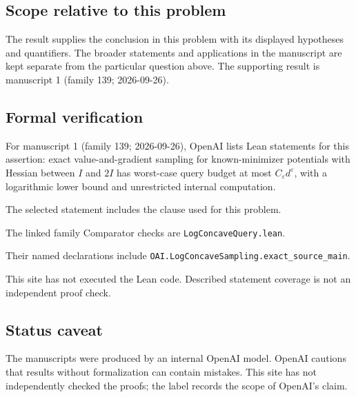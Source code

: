 \documentclass[11pt]{article}
\begin{document}
\subsection{Scope relative to this problem}
The result supplies the conclusion in this problem with its displayed hypotheses and quantifiers. The broader statements and applications in the manuscript are kept separate from the particular question above. The supporting result is manuscript 1 (family 139; 2026-09-26).

\subsection{Formal verification}
For manuscript 1 (family 139; 2026-09-26), OpenAI lists Lean statements for this assertion: exact value-and-gradient sampling for known-minimizer potentials with Hessian between $I$ and $2I$ has worst-case query budget at most $C_\varepsilon d^\varepsilon$, with a logarithmic lower bound and unrestricted internal computation.

The selected statement includes the clause used for this problem.

The linked family Comparator checks are \texttt{LogConcaveQuery.lean}.

Their named declarations include \texttt{OAI.LogConcaveSampling.exact\_source\_main}.

This site has not executed the Lean code. Described statement coverage is not an independent proof check.

\subsection{Status caveat}
The manuscripts were produced by an internal OpenAI model. OpenAI cautions that results without formalization can contain mistakes. This site has not independently checked the proofs; the label records the scope of OpenAI's claim.
\end{document}

